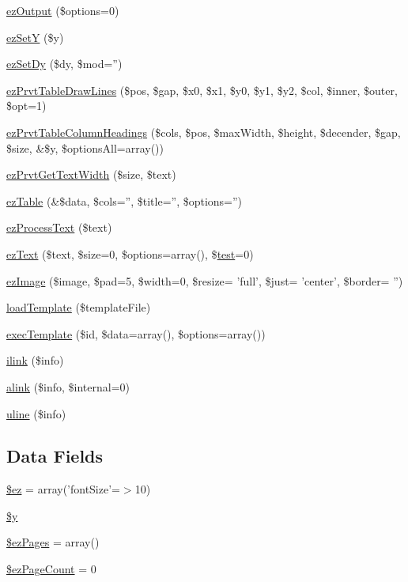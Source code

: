 \begin{DoxyCompactItemize}
\hyperlink{class_cezpdf_a55206d2bcd223a0224af03342c87a21c}{ez\-Output} (\$options=0)
\item 
\hyperlink{class_cezpdf_a1d6285f05e55c3b7b7a67fe14137bd94}{ez\-Set\-Y} (\$y)
\item 
\hyperlink{class_cezpdf_acc115b3048b5abb6f5aa0d92e6c29b04}{ez\-Set\-Dy} (\$dy, \$mod='')
\item 
\hyperlink{class_cezpdf_af1e9318fd5dbb0ff229bd6e315a61abc}{ez\-Prvt\-Table\-Draw\-Lines} (\$pos, \$gap, \$x0, \$x1, \$y0, \$y1, \$y2, \$col, \$inner, \$outer, \$opt=1)
\item 
\hyperlink{class_cezpdf_a7f5b38585eb656d9824fcdbf8065dcaa}{ez\-Prvt\-Table\-Column\-Headings} (\$cols, \$pos, \$max\-Width, \$height, \$decender, \$gap, \$size, \&\$y, \$options\-All=array())
\item 
\hyperlink{class_cezpdf_ab6fec59d56a9ed01bfa44455118f2dc5}{ez\-Prvt\-Get\-Text\-Width} (\$size, \$text)
\item 
\hyperlink{class_cezpdf_a674026b42dbc515ff4cb9072711126ea}{ez\-Table} (\&\$data, \$cols='', \$title='', \$options='')
\item 
\hyperlink{class_cezpdf_a5a002788a14c3f940657f48faca602cc}{ez\-Process\-Text} (\$text)
\item 
\hyperlink{class_cezpdf_a70844d79499d5d80f3dfb0c0b0e9d3c2}{ez\-Text} (\$text, \$size=0, \$options=array(), \$\hyperlink{classtest}{test}=0)
\item 
\hyperlink{class_cezpdf_ada89a558821524c2e841fc46d312d595}{ez\-Image} (\$image, \$pad=5, \$width=0, \$resize= 'full', \$just= 'center', \$border= '')
\item 
\hyperlink{class_cezpdf_aab2e9b4d02c4b68b676c768a12028be6}{load\-Template} (\$template\-File)
\item 
\hyperlink{class_cezpdf_aff23476735753ef4f902d338afacb9cb}{exec\-Template} (\$id, \$data=array(), \$options=array())
\item 
\hyperlink{class_cezpdf_a1b972fc41b5adf6613032c809f16930b}{ilink} (\$info)
\item 
\hyperlink{class_cezpdf_a5a537bb22cf891d5714ab2f5ddb9db30}{alink} (\$info, \$internal=0)
\item 
\hyperlink{class_cezpdf_a9ca06234fc38c2ae74a1f64d573d8c38}{uline} (\$info)
\end{DoxyCompactItemize}
\subsection*{\-Data \-Fields}
\begin{DoxyCompactItemize}
\item 
\hyperlink{class_cezpdf_a4e2d45a06a93dfc4890ad13b642d5795}{\$ez} = array('font\-Size'=$>$10)
\item 
\hyperlink{class_cezpdf_a77b973d137fb33212e018b042df6e3e7}{\$y}
\item 
\hyperlink{class_cezpdf_a83c871beb78c15a5e93fb5c0c143d8de}{\$ez\-Pages} = array()
\item 
\hyperlink{class_cezpdf_a7870a8b7d3cad1346107e48a87165909}{\$ez\-Page\-Count} = 0
\end{DoxyCompactItemize}


